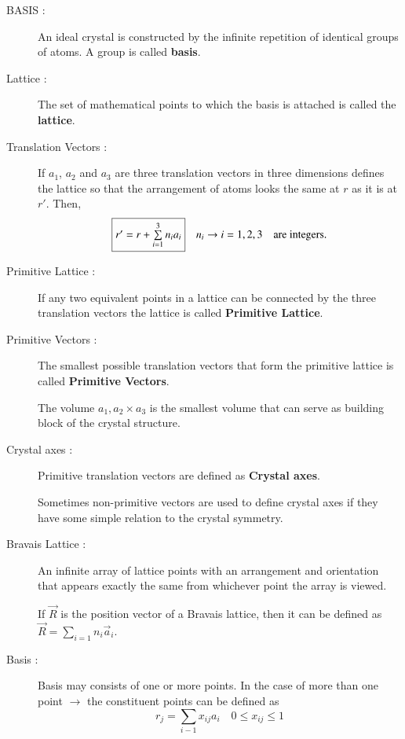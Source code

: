 \begin{description}
\item[BASIS :] An ideal crystal is constructed by the infinite repetition of identical groups of atoms. A group is called {\bf basis}.

\item[Lattice :] The set of mathematical points to which the basis is attached is called the {\bf lattice}.

\item[Translation Vectors :] If $a_{1}$, $a_{2}$ and $a_{3}$ are three translation vectors in three dimensions defines the lattice so that the arrangement of atoms looks the same at $r$ as it is at $r'$. Then,
$$
\fbox{$r'=r+\sum\limits^{3}_{i=1}n_{i}a_{i}$}\quad n_{i}\to i=1,2,3\quad\text{are integers.}
$$

\item[Primitive Lattice :] If any two equivalent points in a lattice can be connected by the three translation vectors the lattice is called {\bf Primitive Lattice}.

\item[Primitive Vectors :] The smallest possible translation vectors that form the primitive lattice is called {\bf Primitive Vectors}.

The volume $a_{1},a_{2}\times a_{3}$ is the smallest volume that can serve as building block of the crystal structure.

\item[Crystal axes :] Primitive translation vectors are defined as {\bf Crystal axes}. 

Sometimes non-primitive vectors are used to define crystal axes if they have some simple relation to the crystal symmetry.

\item[Bravais Lattice :] An infinite array of lattice points with an arrangement and orientation that appears exactly the same from whichever point the array is viewed.

If $\overrightarrow{R}$ is the position vector of a Bravais lattice, then it can be defined as $\overrightarrow{R}=\sum\limits_{i=1}n_{i}\overrightarrow{a}_{i}$.

\item[Basis :] Basis may consists of one or more points. In the case of more than one point $\to$ the constituent points can be defined as
$$
r_{j}=\sum\limits_{i-1}x_{ij}a_{i}\quad 0\leq x_{ij}\leq 1
$$
\end{description}

